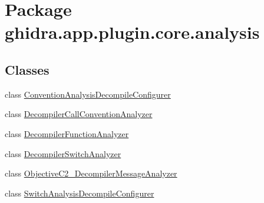 \hypertarget{namespaceghidra_1_1app_1_1plugin_1_1core_1_1analysis}{}\section{Package ghidra.\+app.\+plugin.\+core.\+analysis}
\label{namespaceghidra_1_1app_1_1plugin_1_1core_1_1analysis}
\subsection*{Classes}
\begin{DoxyCompactItemize}
\item 
class \mbox{\hyperlink{classghidra_1_1app_1_1plugin_1_1core_1_1analysis_1_1_convention_analysis_decompile_configurer}{Convention\+Analysis\+Decompile\+Configurer}}
\item 
class \mbox{\hyperlink{classghidra_1_1app_1_1plugin_1_1core_1_1analysis_1_1_decompiler_call_convention_analyzer}{Decompiler\+Call\+Convention\+Analyzer}}
\item 
class \mbox{\hyperlink{classghidra_1_1app_1_1plugin_1_1core_1_1analysis_1_1_decompiler_function_analyzer}{Decompiler\+Function\+Analyzer}}
\item 
class \mbox{\hyperlink{classghidra_1_1app_1_1plugin_1_1core_1_1analysis_1_1_decompiler_switch_analyzer}{Decompiler\+Switch\+Analyzer}}
\item 
class \mbox{\hyperlink{classghidra_1_1app_1_1plugin_1_1core_1_1analysis_1_1_objective_c2___decompiler_message_analyzer}{Objective\+C2\+\_\+\+Decompiler\+Message\+Analyzer}}
\item 
class \mbox{\hyperlink{classghidra_1_1app_1_1plugin_1_1core_1_1analysis_1_1_switch_analysis_decompile_configurer}{Switch\+Analysis\+Decompile\+Configurer}}
\end{DoxyCompactItemize}

